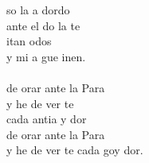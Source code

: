 \begin{cancion}%
	so la a dordo \\
	ante el do  la te\\
	itan  odos\\
	y mi a gue inen.\\
\jump\\
	 de orar ante la Para \\
	y he de ver te \\
	cada antia y dor\\
	 de orar ante la Para\\
	y he de ver te cada goy dor.\\
\end{cancion}%
